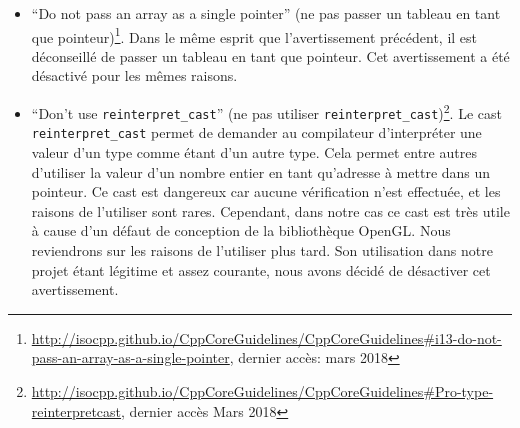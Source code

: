 \begin{itemize}
  l'utilisation des pointeurs simples et
  évidente)\footnote{\url{http://isocpp.github.io/CppCoreGuidelines/CppCoreGuidelines\#es42-keep-use-of-pointers-simple-and-straightforward}, dernier accès: mars 2018}. Cet avertissement recommande de
  ne jamais utiliser de pointeurs pour représenter un tableau, et de ne
  pas faire de calculs sur les adresses des pointeurs. Les erreurs sur
  les accès en dehors de l'espace mémoire alloué à un pointeur sont des
  comportements indéfinis. Afin d'éviter tous risques, il est préférable
  de respecter cette règle. Cependant, le projet que nous avons repris
  ne respecte pas cette règle, et les analyseurs génèrent beaucoup
  d'avertissements. Afin de s'assurer qu'il n'existait pas de problème
  d'accès mémoire, nous avons utilisé des outils d'analyse de mémoire,
  sur lesquels nous reviendront plus tard. Les outils d'analyse de
  mémoire ne relevant aucun problème, nous avons décidé comme solution
  à court terme de désactiver cet avertissement afin de simplifier
  l'étude des autres avertissements. Une solution à long terme sera de
  remplacer les tableaux bruts par les tableaux de la STL
  (\texttt{std::array} ou \texttt{std::vector}). En plus d'une interface
  plus complète, ces types proposent des sécurités de vérification
  d'accès en dehors du tableau en activant les options de débogage des
  implémentations de la STL.
\item
  ``Do not pass an array as a single pointer'' (ne pas passer un tableau
  en tant que
  pointeur)\footnote{\url{http://isocpp.github.io/CppCoreGuidelines/CppCoreGuidelines\#i13-do-not-pass-an-array-as-a-single-pointer}, dernier accès: mars 2018}. Dans le même esprit que
  l'avertissement précédent, il est déconseillé de passer un tableau en
  tant que pointeur. Cet avertissement a été désactivé pour les mêmes
  raisons.
\item
  ``Don't use \texttt{reinterpret\_cast}'' (ne pas utiliser
  \texttt{reinterpret\_cast})\footnote{\url{http://isocpp.github.io/CppCoreGuidelines/CppCoreGuidelines\#Pro-type-reinterpretcast}, dernier accès Mars 2018}. Le cast
  \texttt{reinterpret\_cast} permet de demander au compilateur
  d'interpréter une valeur d'un type comme étant d'un autre type. Cela
  permet entre autres d'utiliser la valeur d'un nombre entier en tant
  qu'adresse à mettre dans un pointeur. Ce cast est dangereux car
  aucune vérification n'est effectuée, et les raisons de l'utiliser sont
  rares. Cependant, dans notre cas ce cast est très utile à cause d'un
  défaut de conception de la bibliothèque OpenGL. Nous reviendrons sur
  les raisons de l'utiliser plus tard. Son utilisation dans notre projet
  étant légitime et assez courante, nous avons décidé de désactiver cet
  avertissement.
\end{itemize}

